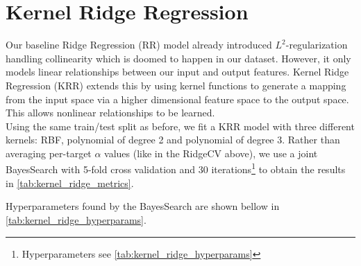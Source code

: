 \section{Kernel Ridge Regression}
\label{sec:kernel_ridge_regression}
Our baseline Ridge Regression (RR) model already introduced $L^2$-regularization handling collinearity which is doomed to happen in our dataset. However, it only models linear relationships between our input and output features. Kernel Ridge Regression (KRR) extends this by using kernel functions to generate a mapping from the input space via a higher dimensional feature space to the output space. This allows nonlinear relationships to be learned. \\
Using the same train/test split as before, we fit a KRR model with three different kernels: RBF, polynomial of degree 2 and polynomial of degree 3. 
Rather than averaging per-target $\alpha$ values (like in the RidgeCV above), we use a joint BayesSearch with 5-fold cross validation and 30 iterations\footnote{Hyperparameters see \autoref{tab:kernel_ridge_hyperparams}} to obtain the results in \autoref{tab:kernel_ridge_metrics}.

\begin{table}[h]
    \centering
    \caption[ subset - iterations to convergence Kernel Ridge regression]{Comparison of different Kernel Ridge regression (KRR) guessing schemes for 102 (20\%) test samples from the  subset from QM9 \parencite{ref:article1_qm9}. The F-score is calculated using the Fock matrix prediction from the Kernel-Ridge regression model and the \texttt{minao} guess. The number of iterations until convergence is shown, as well as the percentage samples not converging within 50 iterations and the inference time as a factor of the inference time of the \texttt{minao} guess.}
    \label{tab:kernel_ridge_metrics}
\end{table}
Hyperparameters found by the BayesSearch are shown bellow in \autoref{tab:kernel_ridge_hyperparams}.


